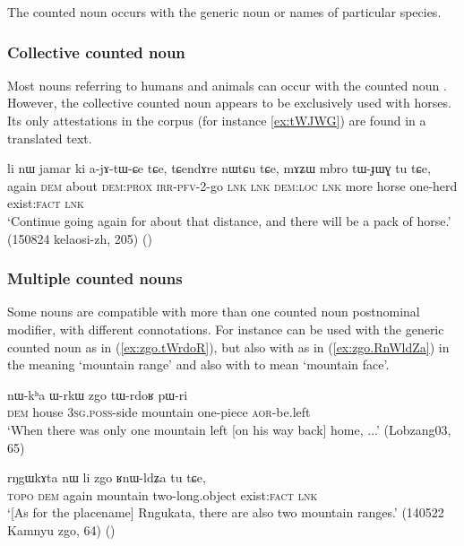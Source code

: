 The counted noun  occurs with the generic noun  or names of particular species.

\subsubsection{Collective counted noun} \label{sec:collective.counted.noun}
Most nouns referring to humans and animals can occur with the counted noun . However, the collective counted noun  appears to be exclusively used with horses. Its only attestations in the corpus (for instance \ref{ex:tWJWG}) are found in a translated text.

\begin{exe}
\ex \label{ex:tWJWG}
\gll li nɯ jamar ki a-jɤ-tɯ-ɕe tɕe, tɕendɤre nɯtɕu tɕe, mɤʑɯ mbro tɯ-ɟɯɣ tu tɕe,  \\
again \textsc{dem} about \textsc{dem}:\textsc{prox} \textsc{irr}-\textsc{pfv}-2-go \textsc{lnk} \textsc{lnk} \textsc{dem}:\textsc{loc} \textsc{lnk} more horse one-herd exist:\textsc{fact} \textsc{lnk} \\
\glt `Continue going again for about that distance, and there will be a pack of horse.' (150824 kelaosi-zh, 205)
()
\end{exe}

\subsubsection{Multiple counted nouns} \label{sec:multiple.CN}
Some nouns are compatible with more than one counted noun postnominal modifier, with different connotations. For instance  can be used with the generic counted noun  as in (\ref{ex:zgo.tWrdoR}), but also with    as in (\ref{ex:zgo.RnWldZa}) in the meaning `mountain range' and also with  to mean `mountain face'.

\begin{exe}
\ex \label{ex:zgo.tWrdoR}
\gll nɯ-kʰa ɯ-rkɯ zgo tɯ-rdoʁ pɯ-ri \\
\textsc{dem} house \textsc{3sg}.\textsc{poss}-side mountain one-piece \textsc{aor}-be.left  \\
\glt `When there was only one mountain left [on his way back] home, ...' (Lobzang03, 65)
\end{exe}

\begin{exe}
\ex \label{ex:zgo.RnWldZa}
\gll rŋgɯkɤta nɯ li zgo ʁnɯ-ldʑa tu tɕe, \\
\textsc{topo} \textsc{dem} again mountain two-long.object exist:\textsc{fact} \textsc{lnk} \\
\glt `[As for the placename] Rngukata, there are also two mountain ranges.' (140522 Kamnyu zgo, 64)
()
\end{exe}

